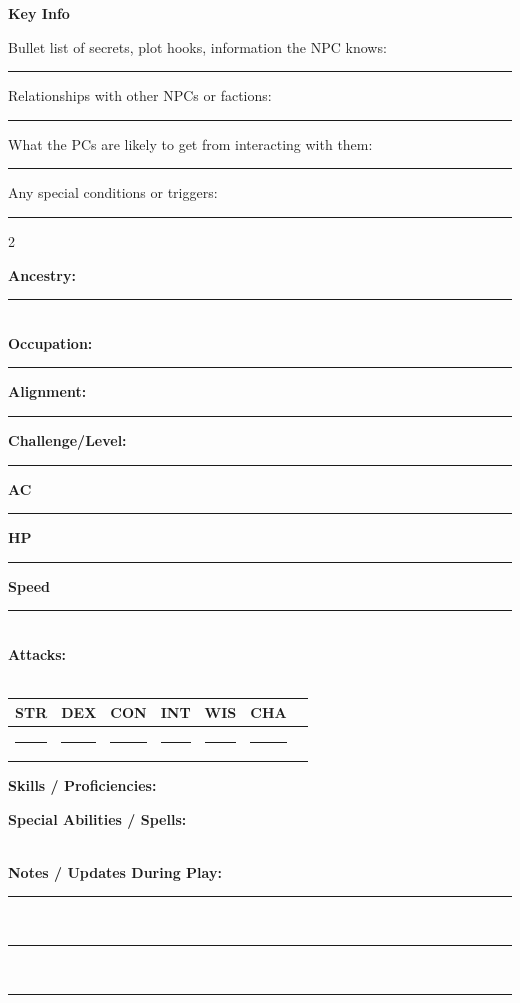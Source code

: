 \documentclass[11pt,letterpaper]{article}
\begin{document}
\noindent\textbf{Key Info}

Bullet list of secrets, plot hooks, information the NPC knows:\\
\rule{\textwidth}{0.4pt}

Relationships with other NPCs or factions:\\
\rule{\textwidth}{0.4pt}

What the PCs are likely to get from interacting with them:\\
\rule{\textwidth}{0.4pt}

Any special conditions or triggers:\\
\rule{\textwidth}{0.4pt}

\vspace{0.0em}

\begin{statbox}

\begin{multicols}{2}

\textbf{Ancestry:} \rule{5.2cm}{0.5pt} \\[4pt]
\textbf{Occupation:} \rule{5.2cm}{0.5pt}

\textbf{Alignment:} \rule{5.2cm}{0.5pt} \quad
\textbf{Challenge/Level:} \rule{4.0cm}{0.5pt}

\vspace{0.6em}

\textbf{AC} \rule{.6cm}{0.5pt} \quad
\textbf{HP} \rule{.6cm}{0.5pt} \quad
\textbf{Speed} \rule{.6cm}{0.5pt} \\
\textbf{Attacks:} \\
\vspace{2.0em} \\

\begin{tabular}{@{}lcccccc@{}}
\toprule
\textbf{STR} & \textbf{DEX} & \textbf{CON} & \textbf{INT} & \textbf{WIS} & \textbf{CHA} \\
\midrule
\rule{1.0cm}{0.4pt} & \rule{1.0cm}{0.4pt} & \rule{1.0cm}{0.4pt} & \rule{1.0cm}{0.4pt} & \rule{1.0cm}{0.4pt} & \rule{1.0cm}{0.4pt} \\
\bottomrule
\end{tabular}


\vspace{1.2em}

\textbf{Skills / Proficiencies:}

\vspace{1.0em}

\textbf{Special Abilities / Spells:} \\

\textbf{} \\


\end{multicols}
\end{statbox}

\vspace{0.0em}

\textbf{Notes / Updates During Play:}\\
\rule{\textwidth}{0.5pt} \\
\rule{\textwidth}{0.5pt} \\
\rule{\textwidth}{0.5pt}
\end{document}
